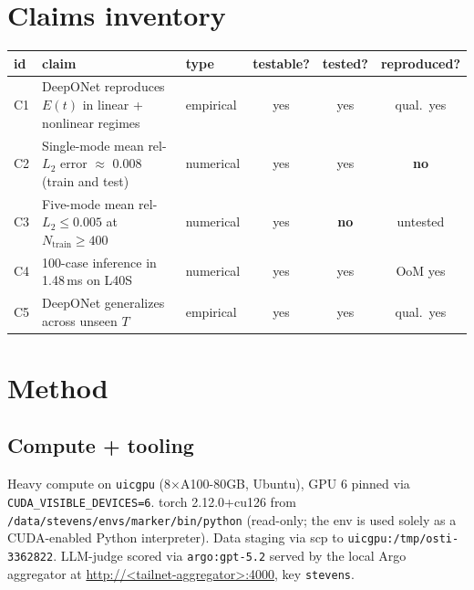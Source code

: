 \documentclass[11pt]{article}
\begin{document}
\section{Claims inventory}
\begin{longtable}{lp{6cm}lccc}
\toprule
id & claim & type & testable? & tested? & reproduced? \\
\midrule
C1 & DeepONet reproduces $E(t)$ in linear + nonlinear regimes & empirical & yes & yes & qual.\ yes \\
C2 & Single-mode mean rel-$L_2$ error $\approx$ 0.008 (train and test) & numerical & yes & yes & \textbf{no} \\
C3 & Five-mode mean rel-$L_2 \le 0.005$ at $N_{\text{train}} \ge 400$ & numerical & yes & \textbf{no} & untested \\
C4 & 100-case inference in 1.48\,ms on L40S & numerical & yes & yes & OoM yes \\
C5 & DeepONet generalizes across unseen $T$ & empirical & yes & yes & qual.\ yes \\
\bottomrule
\end{longtable}

\section{Method}

\subsection{Compute + tooling}
Heavy compute on \texttt{uicgpu} (8$\times$A100-80GB, Ubuntu), GPU 6 pinned via
\texttt{CUDA\_VISIBLE\_DEVICES=6}. torch 2.12.0+cu126 from
\texttt{/data/stevens/envs/marker/bin/python} (read-only; the env is used solely as a
CUDA-enabled Python interpreter). Data staging via scp to
\texttt{uicgpu:/tmp/osti-3362822}. LLM-judge scored via \texttt{argo:gpt-5.2}
served by the local Argo aggregator at
\url{http://<tailnet-aggregator>:4000}, key \texttt{stevens}.
\end{document}
